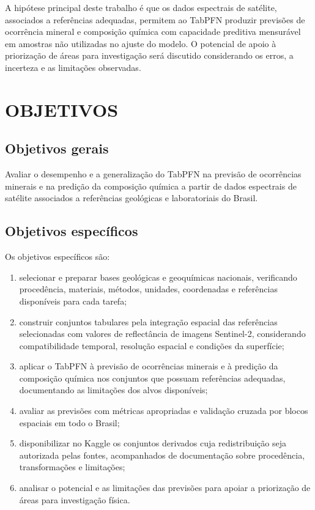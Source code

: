 A hipótese principal deste trabalho é que os dados espectrais de satélite, associados a referências adequadas, permitem ao TabPFN produzir previsões de ocorrência mineral e composição química com capacidade preditiva mensurável em amostras não utilizadas no ajuste do modelo. O potencial de apoio à priorização de áreas para investigação será discutido considerando os erros, a incerteza e as limitações observadas.

\section{OBJETIVOS}

\subsection{Objetivos gerais}

Avaliar o desempenho e a generalização do TabPFN na previsão de ocorrências minerais e na predição da composição química a partir de dados espectrais de satélite associados a referências geológicas e laboratoriais do Brasil.

\subsection{Objetivos específicos}

Os objetivos específicos são:

\begin{enumerate}
    \renewcommand{\labelenumi}{\alph{enumi})}
    \item selecionar e preparar bases geológicas e geoquímicas nacionais, verificando procedência, materiais, métodos, unidades, coordenadas e referências disponíveis para cada tarefa;
    \item construir conjuntos tabulares pela integração espacial das referências selecionadas com valores de reflectância de imagens Sentinel-2, considerando compatibilidade temporal, resolução espacial e condições da superfície;
    \item aplicar o TabPFN à previsão de ocorrências minerais e à predição da composição química nos conjuntos que possuam referências adequadas, documentando as limitações dos alvos disponíveis;
    \item avaliar as previsões com métricas apropriadas e validação cruzada por blocos espaciais em todo o Brasil;
    \item disponibilizar no Kaggle os conjuntos derivados cuja redistribuição seja autorizada pelas fontes, acompanhados de documentação sobre procedência, transformações e limitações;
    \item analisar o potencial e as limitações das previsões para apoiar a priorização de áreas para investigação física.
\end{enumerate}

